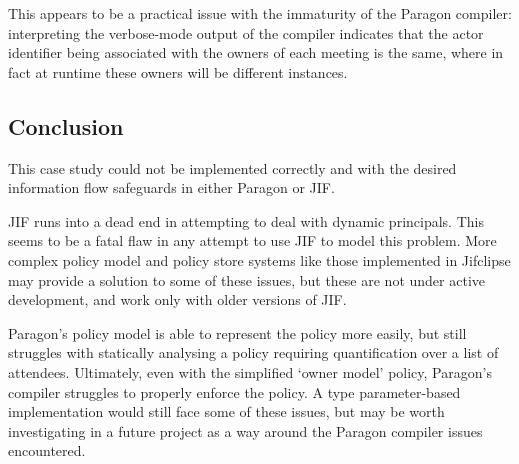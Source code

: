 This appears to be a practical issue with the immaturity of the Paragon compiler: interpreting the verbose-mode output of the compiler indicates that the actor identifier being associated with the owners of each meeting is the same, where in fact at runtime these owners will be different instances.

\subsection{Conclusion}

This case study could not be implemented correctly and with the desired information flow safeguards in either Paragon or JIF.

JIF runs into a dead end in attempting to deal with dynamic principals. This seems to be a fatal flaw in any attempt to use JIF to model this problem. More complex policy model and policy store systems like those implemented in Jifclipse \cite{hicks2007jifclipse} may provide a solution to some of these issues, but these are not under active development, and work only with older versions of JIF.

Paragon's policy model is able to represent the policy more easily, but still struggles with statically analysing a policy requiring quantification over a list of attendees. Ultimately, even with the simplified `owner model' policy, Paragon's compiler struggles to properly enforce the policy. A type parameter-based implementation would still face some of these issues, but may be worth investigating in a future project as a way around the Paragon compiler issues encountered.